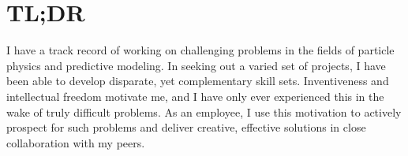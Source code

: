\section{\textbf{TL;DR}}
	I have a track record of working on challenging problems in the fields of particle physics and predictive modeling. In seeking out a varied set of projects, I have been able to develop disparate, yet complementary skill sets. Inventiveness and intellectual freedom motivate me, and I have only ever experienced this in the wake of truly difficult problems. As an employee, I use this motivation to actively prospect for such problems and deliver creative, effective solutions in close collaboration with my peers.